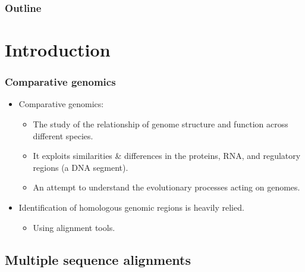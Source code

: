 \documentclass[xcolor=dvipsnames,envcountsect,handout]{beamer}
\begin{document}
\begin{frame}
\frametitle{Outline}
\tableofcontents%
\end{frame}


\section{Introduction}



\begin{frame}
\frametitle{Comparative genomics}
\begin{itemize}
\item Comparative genomics:\vspace{8pt}\\
\begin{itemize}
\item The study of the relationship of genome structure and function
across different species. 
\vspace{6pt}
\item It exploits similarities \& differences in the proteins, RNA, 
and regulatory regions (a DNA segment). 
\vspace{6pt}
\item An attempt to understand the evolutionary processes acting on 
genomes. 
\end{itemize}
\pause
\vspace{6pt}
\item Identification of homologous genomic regions is heavily relied. 
\begin{itemize}
\item Using \alert{alignment} tools.
\end{itemize}
\end{itemize}
\end{frame}


\subsection{Multiple sequence alignments}
\end{document}
